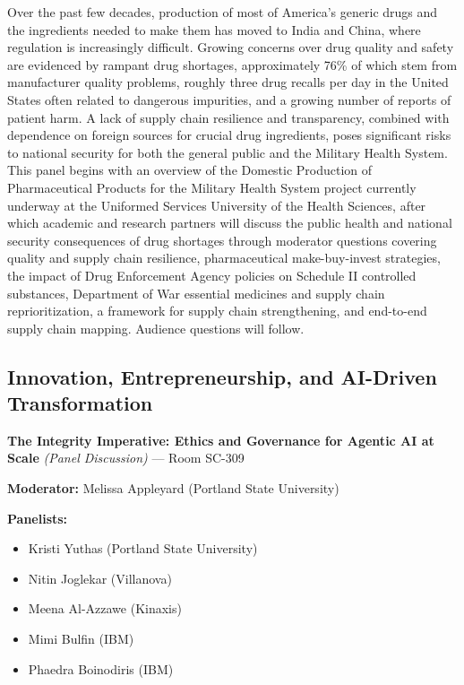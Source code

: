 \documentclass[
  10pt,
  letterpaper,
  DIV=11,
  numbers=noendperiod]{scrartcl}
\providecommand{\tightlist}{%
  \setlength{\itemsep}{0pt}\setlength{\parskip}{0pt}}\usepackage{longtable,booktabs,array}
\begin{document}
Over the past few decades, production of most of America's generic drugs
and the ingredients needed to make them has moved to India and China,
where regulation is increasingly difficult. Growing concerns over drug
quality and safety are evidenced by rampant drug shortages,
approximately 76\% of which stem from manufacturer quality problems,
roughly three drug recalls per day in the United States often related to
dangerous impurities, and a growing number of reports of patient harm. A
lack of supply chain resilience and transparency, combined with
dependence on foreign sources for crucial drug ingredients, poses
significant risks to national security for both the general public and
the Military Health System. This panel begins with an overview of the
Domestic Production of Pharmaceutical Products for the Military Health
System project currently underway at the Uniformed Services University
of the Health Sciences, after which academic and research partners will
discuss the public health and national security consequences of drug
shortages through moderator questions covering quality and supply chain
resilience, pharmaceutical make-buy-invest strategies, the impact of
Drug Enforcement Agency policies on Schedule II controlled substances,
Department of War essential medicines and supply chain reprioritization,
a framework for supply chain strengthening, and end-to-end supply chain
mapping. Audience questions will follow.

\subsection{\texorpdfstring{\textcolor{innovation}{Innovation, Entrepreneurship, and AI-Driven Transformation}}{}}\label{section-51}

\textbf{The Integrity Imperative: Ethics and Governance for Agentic AI
at Scale} \emph{(Panel Discussion)} --- Room SC-309

\textbf{Moderator:} Melissa Appleyard (Portland State University)

\textbf{Panelists:}

\begin{itemize}
\tightlist
\item
  Kristi Yuthas (Portland State University)
\item
  Nitin Joglekar (Villanova)
\item
  Meena Al-Azzawe (Kinaxis)
\item
  Mimi Bulfin (IBM)
\item
  Phaedra Boinodiris (IBM)
\end{itemize}
\end{document}
